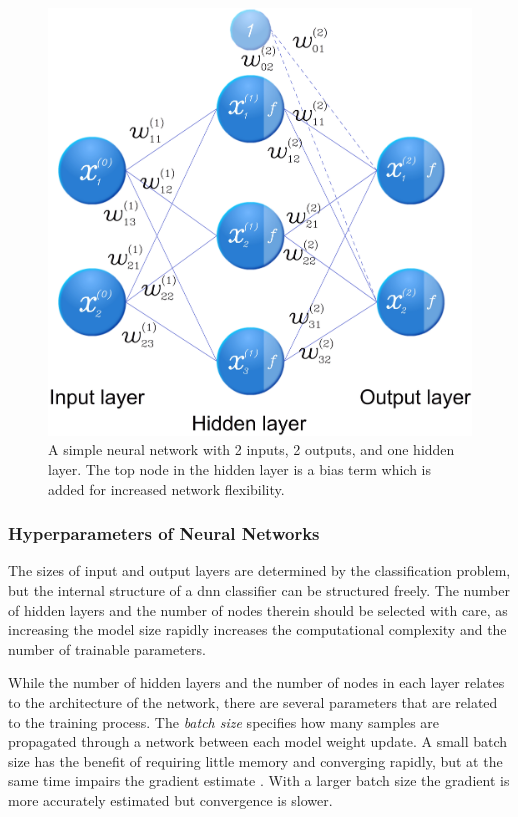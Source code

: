 \begin{figure}[h]
	\centering
	\includegraphics[scale=0.3]{figs_temp/network_graph.jpg}
	\caption{A simple neural network with 2 inputs, 2 outputs, and one hidden layer. The top node in the hidden layer is a bias term which is added for increased network flexibility.}
	\label{fig:ann}
\end{figure}

\subsubsection{Hyperparameters of Neural Networks}

The sizes of input and output layers are determined by the classification problem, but the internal structure of a \gls{dnn} classifier can be structured freely. The number of hidden layers and the number of nodes therein should be selected with care, as increasing the model size rapidly increases the computational complexity and the number of trainable parameters.

While the number of hidden layers and the number of nodes in each layer relates to the architecture of the network, there are several parameters that are related to the training process. The \emph{batch size} specifies how many samples are propagated through a network between each model weight update. A small batch size has the benefit of requiring little memory and converging rapidly, but at the same time impairs the gradient estimate \citep{brownlee_2017}. With a larger batch size the gradient is more accurately estimated but convergence is slower. 

